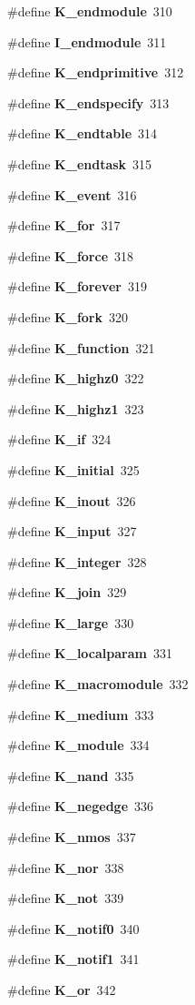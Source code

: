 \begin{CompactItemize}
\item 
\#define {\bf K\_\-endmodule}\ 310
\item 
\#define {\bf I\_\-endmodule}\ 311
\item 
\#define {\bf K\_\-endprimitive}\ 312
\item 
\#define {\bf K\_\-endspecify}\ 313
\item 
\#define {\bf K\_\-endtable}\ 314
\item 
\#define {\bf K\_\-endtask}\ 315
\item 
\#define {\bf K\_\-event}\ 316
\item 
\#define {\bf K\_\-for}\ 317
\item 
\#define {\bf K\_\-force}\ 318
\item 
\#define {\bf K\_\-forever}\ 319
\item 
\#define {\bf K\_\-fork}\ 320
\item 
\#define {\bf K\_\-function}\ 321
\item 
\#define {\bf K\_\-highz0}\ 322
\item 
\#define {\bf K\_\-highz1}\ 323
\item 
\#define {\bf K\_\-if}\ 324
\item 
\#define {\bf K\_\-initial}\ 325
\item 
\#define {\bf K\_\-inout}\ 326
\item 
\#define {\bf K\_\-input}\ 327
\item 
\#define {\bf K\_\-integer}\ 328
\item 
\#define {\bf K\_\-join}\ 329
\item 
\#define {\bf K\_\-large}\ 330
\item 
\#define {\bf K\_\-localparam}\ 331
\item 
\#define {\bf K\_\-macromodule}\ 332
\item 
\#define {\bf K\_\-medium}\ 333
\item 
\#define {\bf K\_\-module}\ 334
\item 
\#define {\bf K\_\-nand}\ 335
\item 
\#define {\bf K\_\-negedge}\ 336
\item 
\#define {\bf K\_\-nmos}\ 337
\item 
\#define {\bf K\_\-nor}\ 338
\item 
\#define {\bf K\_\-not}\ 339
\item 
\#define {\bf K\_\-notif0}\ 340
\item 
\#define {\bf K\_\-notif1}\ 341
\item 
\#define {\bf K\_\-or}\ 342

\end{CompactItemize}
